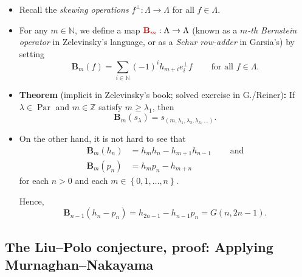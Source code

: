 \documentclass[numbers=enddot,12pt,final,onecolumn,notitlepage]{scrartcl}%
\newcommand{\defn}[1]{{\color{darkred}\emph{#1}}}
\newcommand{\defnm}[1]{{\color{darkred} #1}}
\newcommand{\0}{\phantom{c}}
\let\sumnonlimits\sum
\renewcommand{\sum}{\sumnonlimits\limits}
\begin{document}
\begin{itemize}
\item Recall the \defn{skewing operations} $f^{\perp}:\Lambda\rightarrow
\Lambda$ for all $f\in\Lambda$.

\item For any $m\in\mathbb{N}$, we define a map
$\defnm{\mathbf{B}_{m}}:\Lambda\rightarrow\Lambda$ (known as a
\defn{$m$-th Bernstein operator} in Zelevinsky's language, or as a
\defn{Schur row-adder} in Garsia's) by setting%
\[
\mathbf{B}_{m}\left(  f\right)  =\sum_{i\in\mathbb{N}}\left(  -1\right)
^{i}h_{m+i}e_{i}^{\perp}f\ \ \ \ \ \ \ \ \ \ \text{for all }f\in
\Lambda\text{.}%
\]


\item \textbf{Theorem} (implicit in Zelevinsky's book; solved exercise in
G./Reiner)\textbf{:} If $\lambda\in\operatorname{Par}$ and $m\in\mathbb{Z}$
satisfy $m\geq\lambda_{1}$, then%
\[
\mathbf{B}_{m}\left(  s_{\lambda}\right)  =s_{\left(  m,\lambda_{1}%
,\lambda_{2},\lambda_{3},\ldots\right)  }.
\]


\item On the other hand, it is not hard to see that%
\begin{align*}
\mathbf{B}_{m}\left(  h_{n}\right)   &  =h_{m}h_{n}-h_{m+1}h_{n-1}%
\ \ \ \ \ \ \ \ \ \ \text{and}\\
\mathbf{B}_{m}\left(  p_{n}\right)   &  =h_{m}p_{n}-h_{m+n}%
\end{align*}
for each $n>0$ and each $m\in\left\{  0,1,\ldots,n\right\}  $.

Hence,%
\[
\mathbf{B}_{n-1}\left(  h_{n}-p_{n}\right)  =h_{2n-1}-h_{n-1}p_{n}=G\left(
n,2n-1\right)  .
\]

\end{itemize}

\subsection{The Liu--Polo conjecture, proof: Applying Murnaghan--Nakayama}
\end{document}
